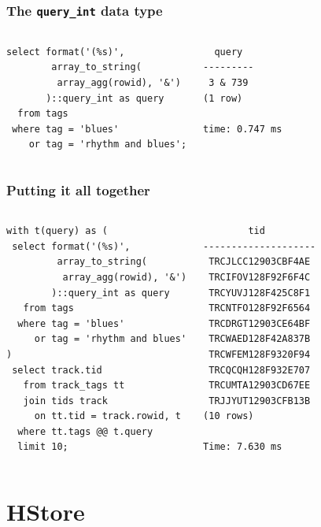 \documentclass{beamer}
\begin{document}
\begin{frame}[fragile]
  \frametitle{The \texttt{query\_int} data type}

  \vfill

\begin{columns}
\begin{verbatim}
select format('(%s)',
        array_to_string(
         array_agg(rowid), '&')
       )::query_int as query
  from tags
 where tag = 'blues'
    or tag = 'rhythm and blues';
\end{verbatim}  
\begin{verbatim}
  query  
---------
 3 & 739
(1 row)

time: 0.747 ms
\end{verbatim}  
\end{columns}
\end{frame}

\begin{frame}[fragile]
  \frametitle{Putting it all together}

\begin{columns}
\begin{verbatim}
with t(query) as (
 select format('(%s)',
         array_to_string(
          array_agg(rowid), '&')
        )::query_int as query
   from tags
  where tag = 'blues'
     or tag = 'rhythm and blues'
)
 select track.tid
   from track_tags tt
   join tids track
     on tt.tid = track.rowid, t
  where tt.tags @@ t.query
  limit 10;
\end{verbatim}  
\begin{verbatim}
        tid         
--------------------
 TRCJLCC12903CBF4AE
 TRCIFOV128F92F6F4C
 TRCYUVJ128F425C8F1
 TRCNTFO128F92F6564
 TRCDRGT12903CE64BF
 TRCWAED128F42A837B
 TRCWFEM128F9320F94
 TRCQCQH128F932E707
 TRCUMTA12903CD67EE
 TRJJYUT12903CFB13B
(10 rows)

Time: 7.630 ms
\end{verbatim}  
\end{columns}
\end{frame}

\section{HStore}
\end{document}
